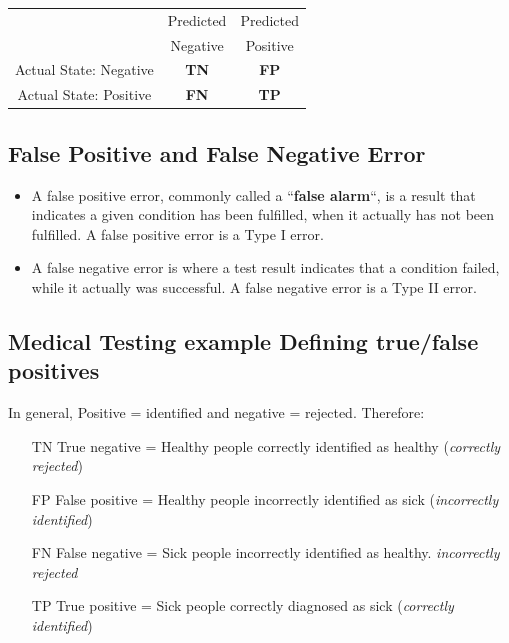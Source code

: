 \documentclass[]{report}
\begin{document}


	\begin{table}[!htbp]
		\centering
		\begin{tabular}{|c | c|c| }
			\hline 
 & Predicted & Predicted \\

			{}   & Negative & Positive       \\ \hline
	Actual State: Negative  &  \textbf{TN} & \textbf{FP}  \\ \hline
Actual State: Positive   &  \textbf{FN} & \textbf{TP}  \\ \hline
		\end{tabular}
	\end{table}
\newpage



\subsection*{False Positive and False Negative Error}

\begin{itemize}
	\item 
	A false positive error, commonly called a ``\textbf{false alarm}``, is a result that indicates
	a given condition has been fulfilled, when it actually has not been
	fulfilled. A false positive error is a Type I error. %
	\item  A false negative error is where a test result indicates that a condition
	failed, while it actually was successful. A false negative error is a Type II
	error.%
\end{itemize}
\subsection*{Medical Testing example Defining true/false positives}
In general, Positive = identified and negative = rejected. Therefore:

\begin{itemize}
	\item[TN] True negative =  Healthy people correctly identified as healthy (\textit{correctly rejected})
	\item[FP] False positive = Healthy people incorrectly identified as sick (\textit{incorrectly identified})
	\item[FN] False negative = Sick people incorrectly identified as healthy. \textit{\textit{incorrectly rejected}}
	\item[TP] True positive = Sick people correctly diagnosed as sick (\textit{correctly identified})
\end{itemize}
\end{document}
